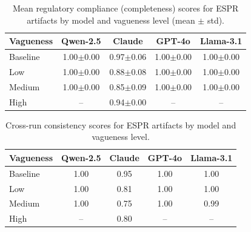 \begin{table}[t]
  \centering
  \caption{Mean regulatory compliance (completeness) scores for ESPR artifacts by model and vagueness level (mean $\pm$ std).}
  \label{tab:espr_completeness}
  \begin{tabular}{lcccc}
    \toprule
    Vagueness & Qwen-2.5 & Claude & GPT-4o & Llama-3.1 \\
    \midrule
    Baseline & 1.00$\pm$0.00 & 0.97$\pm$0.06 & 1.00$\pm$0.00 & 1.00$\pm$0.00 \\
    Low & 1.00$\pm$0.00 & 0.88$\pm$0.08 & 1.00$\pm$0.00 & 1.00$\pm$0.00 \\
    Medium & 1.00$\pm$0.00 & 0.85$\pm$0.09 & 1.00$\pm$0.00 & 1.00$\pm$0.00 \\
    High & -- & 0.94$\pm$0.00 & -- & -- \\
    \bottomrule
  \end{tabular}
\end{table}

\begin{table}[t]
  \centering
  \caption{Cross-run consistency scores for ESPR artifacts by model and vagueness level.}
  \label{tab:espr_consistency}
  \begin{tabular}{lcccc}
    \toprule
    Vagueness & Qwen-2.5 & Claude & GPT-4o & Llama-3.1 \\
    \midrule
    Baseline & 1.00 & 0.95 & 1.00 & 1.00 \\
    Low & 1.00 & 0.81 & 1.00 & 1.00 \\
    Medium & 1.00 & 0.75 & 1.00 & 0.99 \\
    High & -- & 0.80 & -- & -- \\
    \bottomrule
  \end{tabular}
\end{table}

